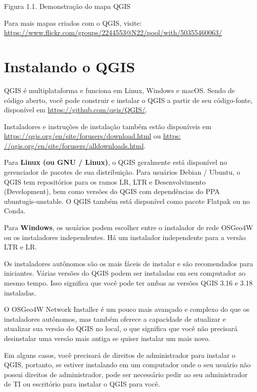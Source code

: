 \documentclass[
]{krantz}
\begin{document}
Figura 1.1. Demonstração do mapa QGIS

Para mais mapas criados com o QGIS, visite: \href{https://www.flickr.com/groups/2244553@N22/\%20piscina/com/50355460063/}{https://www.flickr.com/groups/2244553@N22/pool/with/50355460063/}

\hypertarget{instalando-o-qgis}{%
\section{Instalando o QGIS}\label{instalando-o-qgis}}

QGIS é multiplataforma e funciona em Linux, Windows e macOS. Sendo de código aberto, você pode construir e instalar o QGIS a partir de seu código-fonte, disponível em \url{https://github.com/qgis/QGIS/}.

Instaladores e instruções de instalação também estão disponíveis em \url{https://qgis.org/en/site/forusers/download.html} ou \href{https://qgis.org/en/site/forusers/alldownloads.html}{https: //qgis.org/en/site/forusers/alldownloads.html}.

Para \textbf{Linux (ou GNU / Linux)}, o QGIS geralmente está disponível no gerenciador de pacotes de sua distribuição. Para usuários Debian / Ubuntu, o QGIS tem repositórios para os ramos LR, LTR e Desenvolvimento (Development), bem como versões do QGIS com dependências do PPA ubuntugis-unstable. O QGIS também está disponível como pacote Flatpak ou no Conda.

Para \textbf{Windows}, os usuários podem escolher entre o instalador de rede OSGeo4W ou os instaladores independentes. Há um instalador independente para a versão LTR e LR.

Os instaladores autônomos são os mais fáceis de instalar e são recomendados para iniciantes. Várias versões do QGIS podem ser instaladas em seu computador ao mesmo tempo. Isso significa que você pode ter ambas as versões QGIS 3.16 e 3.18 instaladas.

O OSGeo4W Network Installer é um pouco mais avançado e complexo do que os instaladores autônomos, mas também oferece a capacidade de atualizar e atualizar sua versão do QGIS no local, o que significa que você não precisará desinstalar uma versão mais antiga se quiser instalar um mais novo.

Em alguns casos, você precisará de direitos de administrador para instalar o QGIS, portanto, se estiver instalando em um computador onde o seu usuário não possui direitos de administrador, pode ser necessário pedir ao seu administrador de TI ou escritório para instalar o QGIS para você.
\end{document}
